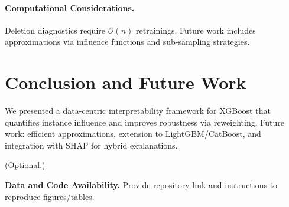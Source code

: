 \documentclass[sn-basic]{sn-jnl} %
\begin{document}
\paragraph{Computational Considerations.} Deletion diagnostics require $\mathcal{O}(n)$ retrainings. Future work includes approximations via influence functions and sub-sampling strategies.

\section{Conclusion and Future Work}
We presented a data-centric interpretability framework for XGBoost that quantifies instance influence and improves robustness via reweighting. Future work: efficient approximations, extension to LightGBM/CatBoost, and integration with SHAP for hybrid explanations.

(Optional.)

\vspace{1em}
\noindent\textbf{Data and Code Availability.} Provide repository link and instructions to reproduce figures/tables.




%
\end{document}
